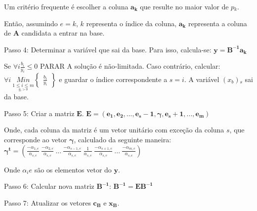 Um critério frequente é escolher a coluna $\mathbf{a{_k}}$ que resulte no maior valor de $\mathit{p{_k}}$.

Então, assumindo $\mathit{e} = \mathit{k}$, $\mathit{k}$ representa o índice da coluna, $\mathbf{a{_k}}$ representa a coluna de $\mathbf{A}$ candidata a entrar na base. 

Passo 4: Determinar a variável que sai da base. Para isso, calcula-se: $\mathbf{y}=\mathbf{B^{-1}a{_k}}$

Se $\forall i\mathit{\frac{b{_i}}{y{_i}}}\leq 0$ PARAR A solução é não-limitada. Caso contrário, calcular:
$\forall i\ \underset{\underset{y{_i}>0}{1\leq i\leq m}}{Min}\begin{Bmatrix}
\mathit{\frac{b{_i}}{y{_i}}}
\end{Bmatrix}$ e guardar o índice correspondente a $s = i$. A variável $(x{_b}){_s}$ sai da base.

Passo 5: Criar a matriz $\mathbf{E}$.
$\mathbf{E}=(\mathbf{e{_1}},\mathbf{e{_2}},...,\mathbf{e{_s-1}},\mathbf{\gamma} , \mathbf{e{_s+1}},...,\mathbf{e{_m}})$

Onde, cada coluna da matriz é um vetor unitário com exceção da coluna $\mathit{s}$, que corresponde ao vetor $\mathbf{\gamma}$, calculado da seguinte maneira:
$\mathbf{\gamma^{t}}=\left( \mathit{\frac{-\alpha {_{1,e}}}{\alpha {_{s,e}}}}\ \mathit{\frac{-\alpha {_{2,e}}}{\alpha {_{s,e}}}}\ ...\ \mathit{\frac{-\alpha {_{s-1,e}}}{\alpha {_{s,e}}}}\ \mathit{\frac{1}{\alpha {_{s,e}}}\ \frac{-\alpha {_{s+1,e}}}{\alpha {_{s,e}}}}\ ...\ \mathit{\frac{-\alpha {_{m,e}}}{\alpha {_{s,e}}}} \right )$

Onde $\mathit{\alpha{_ie}}$ são os elementos vetor do $\mathbf{y}$.

Passo 6: Calcular nova matriz $\mathbf{B^{-1}}$: $\mathbf{B^{-1}} = \mathbf{EB^{-1}}$

Passo 7: Atualizar os vetores $\mathbf{c{_B}}$ e $\mathbf{x{_B}}$.
